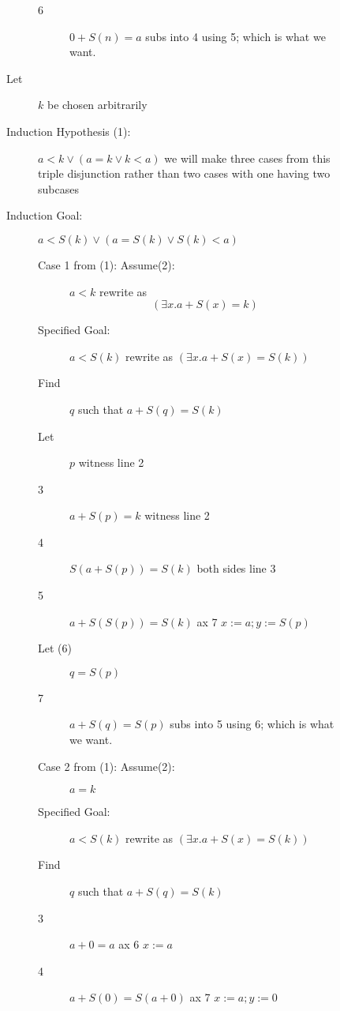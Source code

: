 \documentclass[12pt]{article}
\begin{document}
\begin{description}
\begin{description}
\begin{description}
\begin{description}
\item[6]  $0+S(n)=a$  subs into 4 using 5; which is what we want.

\end{description}


\item[Let] $k$ be chosen arbitrarily

\item[Induction Hypothesis (1):]  $a<k \vee (a=k \vee k<a)$  we will make three cases from this triple disjunction rather than two cases with one having two subcases

\item[Induction Goal:]  $a<S(k) \vee (a=S(k)\vee S(k)<a)$

\begin{description}

\item[Case 1 from (1): Assume(2):]  $a<k$  rewrite as $$(\exists x.a+S(x)=k)$$

\item[Specified Goal:]  $a<S(k)$ rewrite as $(\exists x.a+S(x)=S(k))$

\item[Find]  $q$ such that $a+S(q)=S(k)$

\item[Let] $p$ witness line 2

\item[3]  $a+S(p)=k$  witness line 2

\item[4]  $S(a+S(p))=S(k)$ both sides line 3

\item[5] $a+S(S(p))=S(k)$  ax 7  $x:=a; y:=S(p)$

\item[Let (6)] $q=S(p)$

\item[7]  $a+S(q)=S(p)$  subs into 5 using 6; which is what we want.


\item[Case 2 from (1): Assume(2):] $a=k$

\item[Specified Goal:]  $a<S(k)$ rewrite as $(\exists x.a+S(x)=S(k))$

\item[Find]  $q$ such that $a+S(q)=S(k)$

\item[3] $a+0=a$  ax 6 $x:=a$

\item[4] $a+S(0)=S(a+0)$  ax 7 $x:=a;y:=0$


\end{description}
\end{description}
\end{description}
\end{description}
\end{document}
